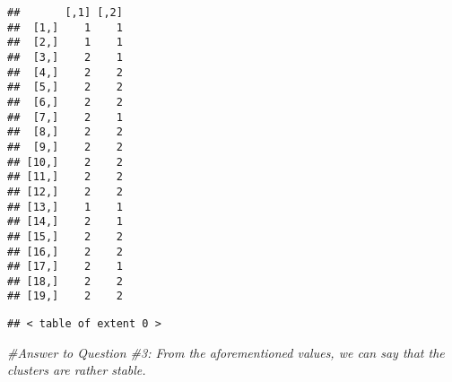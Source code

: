 \documentclass[
]{article}
\newenvironment{Shaded}{\begin{snugshade}}{\end{snugshade}}
\newcommand{\CommentTok}[1]{\textcolor[rgb]{0.56,0.35,0.01}{\textit{#1}}}
\newcommand{\DecValTok}[1]{\textcolor[rgb]{0.00,0.00,0.81}{#1}}
\newcommand{\FunctionTok}[1]{\textcolor[rgb]{0.00,0.00,0.00}{#1}}
\newcommand{\NormalTok}[1]{#1}
\newcommand{\OtherTok}[1]{\textcolor[rgb]{0.56,0.35,0.01}{#1}}
\newcommand{\SpecialCharTok}[1]{\textcolor[rgb]{0.00,0.00,0.00}{#1}}
\begin{document}
\begin{verbatim}
##       [,1] [,2]
##  [1,]    1    1
##  [2,]    1    1
##  [3,]    2    1
##  [4,]    2    2
##  [5,]    2    2
##  [6,]    2    2
##  [7,]    2    1
##  [8,]    2    2
##  [9,]    2    2
## [10,]    2    2
## [11,]    2    2
## [12,]    2    2
## [13,]    1    1
## [14,]    2    1
## [15,]    2    2
## [16,]    2    2
## [17,]    2    1
## [18,]    2    2
## [19,]    2    2
\end{verbatim}

\begin{Shaded}
\end{Shaded}

\begin{verbatim}
## < table of extent 0 >
\end{verbatim}

\begin{Shaded}
\begin{Highlighting}[]
\CommentTok{\#Answer to Question \#3: From the aforementioned values, we can say that the clusters are rather stable. }
\end{Highlighting}
\end{Shaded}

\begin{Shaded}
\end{Shaded}
\end{document}
